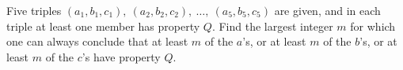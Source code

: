 Five triples $(a_1,b_1,c_1),\ (a_2,b_2,c_2),\ \dots,\ (a_5,b_5,c_5)$ are given, and in each triple at least one member has property $Q$. Find the largest integer $m$ for which one can always conclude that at least $m$ of the $a$'s, or at least $m$ of the $b$'s, or at least $m$ of the $c$'s have property $Q$.

